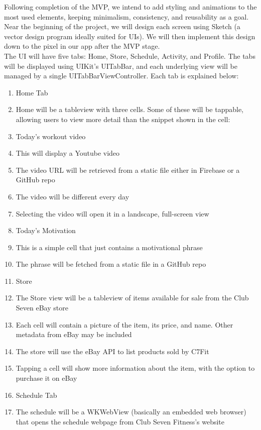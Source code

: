 \documentclass[letterpaper,10pt,titlepage]{article}
\begin{document}
Following completion of the MVP, we intend to add styling and animations to the most used elements, keeping minimalism, consistency, and reusability as a goal. Near the beginning of the project, we will design each screen using Sketch (a vector design program ideally suited for UIs). We will then implement this design down to the pixel in our app after the MVP stage.\\


The UI will have five tabs: Home, Store, Schedule, Activity, and Profile. The tabs will be displayed using UIKit’s UITabBar, and each underlying view will be managed by a single UITabBarViewController. Each tab is explained below:\\

\begin{enumerate}
\item Home Tab
\item Home will be a tableview with three cells. Some of these will be tappable, allowing users to view more detail than the snippet shown in the cell:
\item Today’s workout video
\item This will display a Youtube video
\item The video URL will be retrieved from a static file either in Firebase or a GitHub repo
\item The video will be different every day
\item Selecting the video will open it in a landscape, full-screen view
\item Today’s Motivation
\item This is a simple cell that just contains a motivational phrase
\item The phrase will be fetched from a static file in a GitHub repo
\item Store
\item The Store view will be a tableview of items available for sale from the Club Seven eBay store
\item Each cell will contain a picture of the item, its price, and name. Other metadata from eBay may be included
\item The store will use the eBay API to list products sold by C7Fit
\item Tapping a cell will show more information about the item, with the option to purchase it on eBay
\item Schedule Tab
\item The schedule will be a WKWebView (basically an embedded web browser) that opens the schedule webpage from Club Seven Fitness's website

\end{enumerate}
\end{document}
